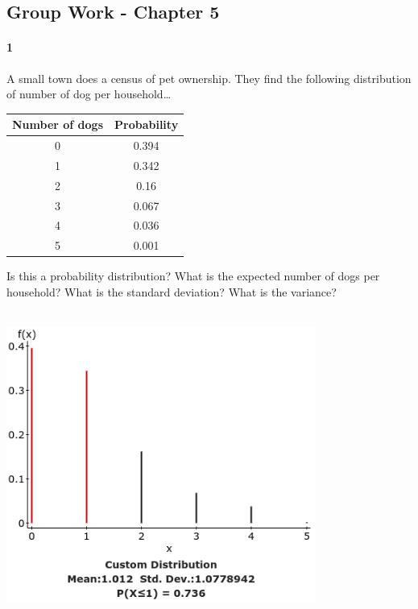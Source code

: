 \documentclass{article}
\begin{document}
\begin{flushleft}
\section*{Group Work - Chapter 5}
\paragraph{1} A small town does a census of pet ownership. They find the following distribution of number of dog per household\ldots\\
{\centering
\begin{tabular}{c | c}
Number of dogs & Probability\\
\hline
0 & 0.394\\
1 & 0.342\\
2 & 0.16\\
3 & 0.067\\
4 & 0.036\\
5 & 0.001\\
\end{tabular} \par}
\begin{enumalpha}
\item Is this a probability distribution? What is the expected number of dogs per household? What is the standard deviation? What is the variance?\\
\medskip
{}\\
\medskip
{\centering
\includegraphics[width=4in]{images/grp05_Q1_a}
\par}



\end{enumalpha}
\end{flushleft}
\end{document}

